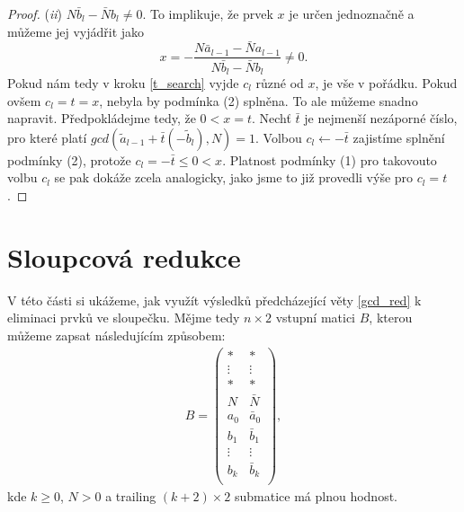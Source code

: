 \begin{proof}
(\textit{ii}) $ N \bar{b}_l - \bar{N} b_l \neq 0 $.
To implikuje, že prvek $ x $ je určen jednoznačně a můžeme jej vyjádřit jako
\begin{equation}\label{frac}
    x = -\frac{N \bar{a}_{l-1} - \bar{N} a_{l-1}} {N \bar{b}_l - \bar{N} b_l}
      \neq 0.
\end{equation}
Pokud nám tedy v kroku \ref{t_search} vyjde $ c_l $ různé od $ x $, je vše v pořádku.
Pokud ovšem $ c_l = t = x $, nebyla by podmínka (2) splněna.
To ale můžeme snadno napravit. Předpokládejme tedy, že $ 0 < x = t $.
Nechť $ \bar{t} $ je nejmenší nezáporné číslo, pro které platí
$ gcd(\tilde{a}_{l-1} + \bar{t} (-\tilde{b}_{l}), N) = 1 $. Volbou $ c_l \leftarrow -\bar{t}$
zajistíme splnění podmínky (2), protože $ c_l = -\bar{t} \leq 0 < x $. Platnost
podmínky (1) pro takovouto volbu $ c_l $ se pak dokáže zcela analogicky, jako
jsme to již provedli výše pro $ c_l = t $.
\end{proof}





\section{Sloupcová redukce}

V této části si ukážeme, jak využít výsledků předcházející věty \ref{gcd_red} k
eliminaci prvků ve sloupečku. Mějme tedy $ n \times 2 $
vstupní matici $ B $, kterou můžeme zapsat následujícím způsobem:
\begin{align} \label{B_col}
B =
    \begin{pmatrix}
        \ast   & \ast   \\
        \vdots & \vdots \\
        \ast   & \ast   \\
        N & \bar{N} \\
        a_0 & \bar{a}_0  \\
        b_1 & \bar{b}_1  \\
        \vdots & \vdots  \\
        b_k & \bar{b}_k  \\
    \end{pmatrix}
,
\end{align}
kde $ k \geq 0 $, $ N > 0 $ a trailing $ (k+2) \times 2 $ submatice má plnou
hodnost.

